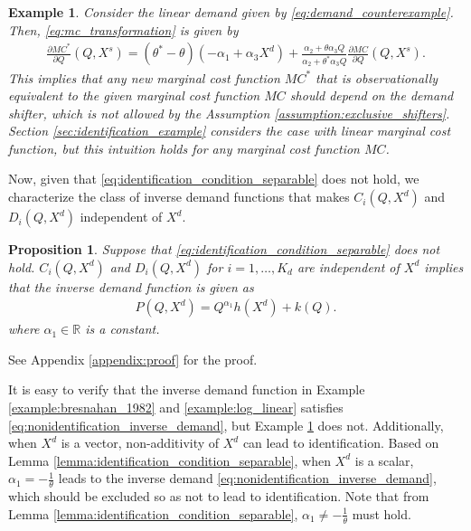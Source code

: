 \documentclass[11pt, a4paper]{article}
\newtheorem{proposition}{Proposition}
\newtheorem{example}{Example}
\theoremstyle{remark}
\begin{document}
\begin{example}\label{example:demand_counterexample}
    Consider the linear demand given by \eqref{eq:demand_counterexample}.
    Then, \eqref{eq:mc_transformation} is given by
    \begin{align}
        \frac{\partial MC^{*}}{\partial Q}(Q, X^{s}) = (\theta^{*} - \theta)(-\alpha_1 + \alpha_3X^{d}) +  \frac{\alpha_2 + \theta\alpha_3Q}{\alpha_2 + \theta^{*}\alpha_3Q}\frac{\partial MC}{\partial Q}(Q, X^{s}).
    \end{align}
    This implies that any new marginal cost function $MC^{*}$ that is observationally equivalent to the given marginal cost function $MC$ should depend on the demand shifter, which is not allowed by the Assumption \ref{assumption:exclusive_shifters}.
    Section \ref{sec:identification_example} considers the case with linear marginal cost function, but this intuition holds for any marginal cost function $MC$.
\end{example}









Now, given that \eqref{eq:identification_condition_separable} does not hold, we characterize the class of inverse demand functions that makes $C_i(Q, X^{d})$ and $D_i(Q, X^{d})$ independent of $X^{d}$.
\begin{proposition}\label{proposition:non-identification_inverse_demand}
    Suppose that \eqref{eq:identification_condition_separable} does not hold.
    $C_i(Q, X^{d})$ and $D_i(Q, X^{d})$ for $i = 1, \ldots, K_d$ are independent of $X^{d}$ implies that the inverse demand function is given as
    \begin{align}
        P(Q, X^{d}) = Q^{\alpha_1}h(X^{d}) + k(Q). \label{eq:nonidentification_inverse_demand}
    \end{align}
    where $\alpha_1 \in \mathbb{R}$ is a constant.
\end{proposition}
See Appendix \ref{appendix:proof} for the proof.


It is easy to verify that the inverse demand function in Example \ref{example:bresnahan_1982} and \ref{example:log_linear} satisfies \eqref{eq:nonidentification_inverse_demand}, but Example \ref{example:demand_counterexample} does not.
Additionally, when $X^{d}$ is a vector, non-additivity of $X^{d}$ can lead to identification.
Based on Lemma \ref{lemma:identification_condition_separable}, when $X^{d}$ is a scalar, $\alpha_1 = -\frac{1}{\theta}$ leads to the inverse demand \eqref{eq:nonidentification_inverse_demand}, which should be excluded so as not to lead to identification.
Note that from Lemma \ref{lemma:identification_condition_separable}, $\alpha_1 \ne -\frac{1}{\theta}$ must hold.
\end{document}
